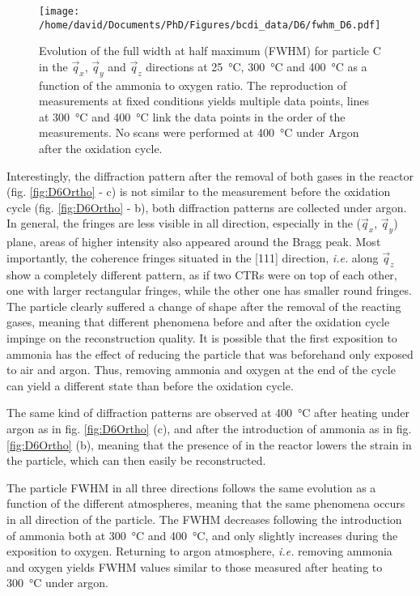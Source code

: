 \begin{figure}[!hbt]
    \centering
    \texttt{[image: /home/david/Documents/PhD/Figures/bcdi\_data/D6/fwhm\_D6.pdf]}
    \caption{
        Evolution of the full width at half maximum (FWHM) for particle C in the $\vec{q}_x$, $\vec{q}_y$ and $\vec{q}_z$ directions at \qty{25}{\degreeCelsius}, \qty{300}{\degreeCelsius} and \qty{400}{\degreeCelsius} as a function of the ammonia to oxygen ratio.
        The reproduction of measurements at fixed conditions yields multiple data points, lines at \qty{300}{\degreeCelsius} and \qty{400}{\degreeCelsius} link the data points in the order of the measurements.
        No scans were performed at \qty{400}{\degreeCelsius} under Argon after the oxidation cycle.
    }
    \label{fig:D6FWHM}
\end{figure}

Interestingly, the diffraction pattern after the removal of both gases in the reactor (fig. \ref{fig:D6Ortho} - c) is not similar to the measurement before the oxidation cycle (fig. \ref{fig:D6Ortho} - b), both diffraction patterns are collected under argon.
In general, the fringes are less visible in all direction, especially in the ($\vec{q}_x$, $\vec{q}_y$) plane, areas of higher intensity also appeared around the Bragg peak.
Most importantly, the coherence fringes situated in the [111] direction, \textit{i.e.} along $\vec{q}_z$ show a completely different pattern, as if two CTRs were on top of each other, one with larger rectangular fringes, while the other one has smaller round fringes.
The particle clearly suffered a change of shape after the removal of the reacting gases, meaning that different phenomena before and after the oxidation cycle impinge on the reconstruction quality.
It is possible that the first exposition to ammonia has the effect of reducing the particle that was beforehand only exposed to air and argon.
Thus, removing ammonia and oxygen at the end of the cycle can yield a different state than before the oxidation cycle.

The same kind of diffraction patterns are observed at \qty{400}{\degreeCelsius} after heating under argon as in fig. \ref{fig:D6Ortho} (c), and after the introduction of ammonia as in fig. \ref{fig:D6Ortho} (b), meaning that the presence of  in the reactor lowers the strain in the particle, which can then easily be reconstructed.

The particle FWHM in all three directions follows the same evolution as a function of the different atmospheres, meaning that the same phenomena occurs in all direction of the particle.
The FWHM decreases following the introduction of ammonia both at \qty{300}{\degreeCelsius} and \qty{400}{\degreeCelsius}, and only slightly increases during the exposition to oxygen.
Returning to argon atmosphere, \textit{i.e.} removing ammonia and oxygen yields FWHM values similar to those measured after heating to \qty{300}{\degreeCelsius} under argon.

